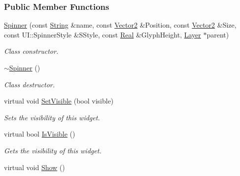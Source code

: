 \subsubsection*{Public Member Functions}
\begin{DoxyCompactItemize}
\item 
\hyperlink{classphys_1_1UI_1_1Spinner_ab82a06990b7422d1c028069608b32d85}{Spinner} (const \hyperlink{namespacephys_aa03900411993de7fbfec4789bc1d392e}{String} \&name, const \hyperlink{classphys_1_1Vector2}{Vector2} \&Position, const \hyperlink{classphys_1_1Vector2}{Vector2} \&Size, const UI::SpinnerStyle \&SStyle, const \hyperlink{namespacephys_af7eb897198d265b8e868f45240230d5f}{Real} \&GlyphHeight, \hyperlink{classphys_1_1UI_1_1Layer}{Layer} $\ast$parent)
\begin{DoxyCompactList}\small\item\em Class constructor. \item\end{DoxyCompactList}\item 
\hypertarget{classphys_1_1UI_1_1Spinner_adc7629a1ef57ef62a4e453ce3c66d808}{
\hyperlink{classphys_1_1UI_1_1Spinner_adc7629a1ef57ef62a4e453ce3c66d808}{$\sim$Spinner} ()}
\label{d7/d81/classphys_1_1UI_1_1Spinner_adc7629a1ef57ef62a4e453ce3c66d808}

\begin{DoxyCompactList}\small\item\em Class destructor. \item\end{DoxyCompactList}\item 
virtual void \hyperlink{classphys_1_1UI_1_1Spinner_a4fddc28f38174c4a89761efa00ae88c3}{SetVisible} (bool visible)
\begin{DoxyCompactList}\small\item\em Sets the visibility of this widget. \item\end{DoxyCompactList}\item 
virtual bool \hyperlink{classphys_1_1UI_1_1Spinner_a3bb14ddd6426debf035e65b9885bc25b}{IsVisible} ()
\begin{DoxyCompactList}\small\item\em Gets the visibility of this widget. \item\end{DoxyCompactList}\item 
\hypertarget{classphys_1_1UI_1_1Spinner_ac30c60ae55de67078a09c2d996a694fa}{
virtual void \hyperlink{classphys_1_1UI_1_1Spinner_ac30c60ae55de67078a09c2d996a694fa}{Show} ()}
\label{d7/d81/classphys_1_1UI_1_1Spinner_ac30c60ae55de67078a09c2d996a694fa}


\end{DoxyCompactItemize}
